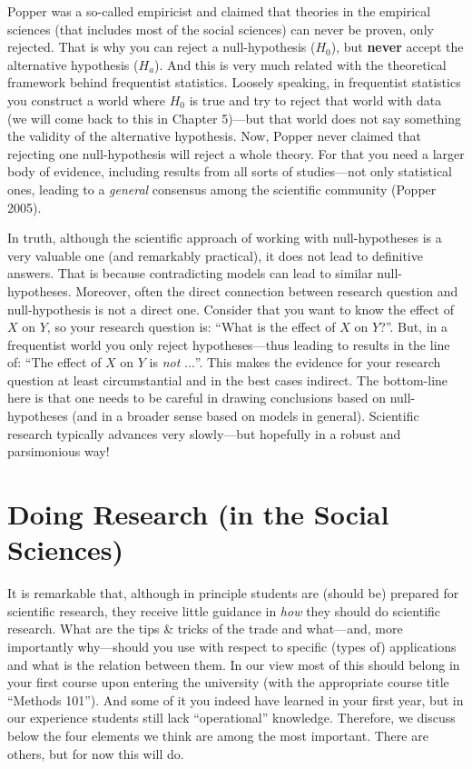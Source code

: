 \documentclass[
]{book}
\begin{document}
Popper was a so-called empiricist and claimed that theories in the empirical sciences (that includes most of the social sciences) can never be proven, only rejected. That is why you can reject a null-hypothesis (\(H_0\)), but \textbf{never} accept the alternative hypothesis (\(H_a\)). And this is very much related with the theoretical framework behind frequentist statistics. Loosely speaking, in frequentist statistics you construct a world where \(H_0\) is true and try to reject that world with data (we will come back to this in Chapter 5)---but that world does not say something the validity of the alternative hypothesis. Now, Popper never claimed that rejecting one null-hypothesis will reject a whole theory. For that you need a larger body of evidence, including results from all sorts of studies---not only statistical ones, leading to a \emph{general} consensus among the scientific community (Popper 2005).

In truth, although the scientific approach of working with null-hypotheses is a very valuable one (and remarkably practical), it does not lead to definitive answers. That is because contradicting models can lead to similar null-hypotheses. Moreover, often the direct connection between research question and null-hypothesis is not a direct one. Consider that you want to know the effect of \(X\) on \(Y\), so your research question is: ``What is the effect of \(X\) on \(Y\)?''. But, in a frequentist world you only reject hypotheses---thus leading to results in the line of: ``The effect of \(X\) on \(Y\) is \emph{not} \(\ldots\)''. This makes the evidence for your research question at least circumstantial and in the best cases indirect. The bottom-line here is that one needs to be careful in drawing conclusions based on null-hypotheses (and in a broader sense based on models in general). Scientific research typically advances very slowly---but hopefully in a robust and parsimonious way!

\hypertarget{doing-research-in-the-social-sciences}{%
\section{Doing Research (in the Social Sciences)}\label{doing-research-in-the-social-sciences}}

It is remarkable that, although in principle students are (should be) prepared for scientific research, they receive little guidance in \emph{how} they should do scientific research. What are the tips \& tricks of the trade and what---and, more importantly why---should you use with respect to specific (types of) applications and what is the relation between them. In our view most of this should belong in your first course upon entering the university (with the appropriate course title ``Methods 101''). And some of it you indeed have learned in your first year, but in our experience students still lack ``operational'' knowledge. Therefore, we discuss below the four elements we think are among the most important. There are others, but for now this will do.
\end{document}
